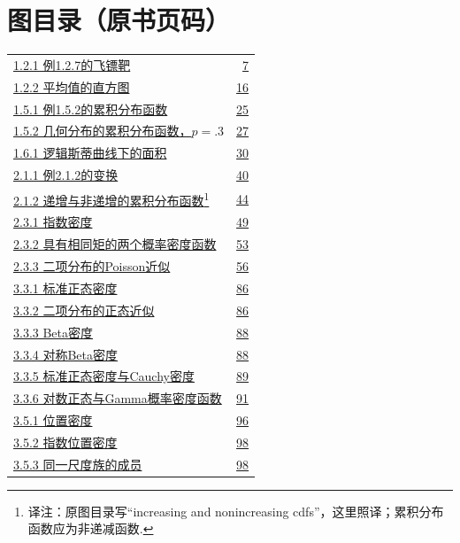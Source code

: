 \section*{图目录（原书页码）}\label{front:figures}
\begingroup\small
\begin{longtable}{@{}p{}r@{}}
\hyperref[fig:1.2.1]{1.2.1 例1.2.7的飞镖靶} & \hyperref[fig:1.2.1]{7} \\
\hyperref[fig:1.2.2]{1.2.2 平均值的直方图} & \hyperref[fig:1.2.2]{16} \\
\hyperref[fig:1.5.1]{1.5.1 例1.5.2的累积分布函数} & \hyperref[fig:1.5.1]{25} \\
\hyperref[fig:1.5.2]{1.5.2 几何分布的累积分布函数，$p=.3$} & \hyperref[fig:1.5.2]{27} \\
\hyperref[fig:1.6.1]{1.6.1 逻辑斯蒂曲线下的面积} & \hyperref[fig:1.6.1]{30} \\
\hyperref[fig:2.1.1]{2.1.1 例2.1.2的变换} & \hyperref[fig:2.1.1]{40} \\
\hyperref[fig:2.1.2]{2.1.2 递增与非递增的累积分布函数}\footnote{译注：原图目录写“increasing and nonincreasing cdfs”，这里照译；累积分布函数应为非递减函数.} & \hyperref[fig:2.1.2]{44} \\
\hyperref[fig:2.3.1]{2.3.1 指数密度} & \hyperref[fig:2.3.1]{49} \\
\hyperref[fig:2.3.2]{2.3.2 具有相同矩的两个概率密度函数} & \hyperref[fig:2.3.2]{53} \\
\hyperref[fig:2.3.3]{2.3.3 二项分布的Poisson近似} & \hyperref[fig:2.3.3]{56} \\
\hyperref[fig:3.3.1]{3.3.1 标准正态密度} & \hyperref[fig:3.3.1]{86} \\
\hyperref[fig:3.3.2]{3.3.2 二项分布的正态近似} & \hyperref[fig:3.3.2]{86} \\
\hyperref[fig:3.3.3]{3.3.3 Beta密度} & \hyperref[fig:3.3.3]{88} \\
\hyperref[fig:3.3.4]{3.3.4 对称Beta密度} & \hyperref[fig:3.3.4]{88} \\
\hyperref[fig:3.3.5]{3.3.5 标准正态密度与Cauchy密度} & \hyperref[fig:3.3.5]{89} \\
\hyperref[fig:3.3.6]{3.3.6 对数正态与Gamma概率密度函数} & \hyperref[fig:3.3.6]{91} \\
\hyperref[fig:3.5.1]{3.5.1 位置密度} & \hyperref[fig:3.5.1]{96} \\
\hyperref[fig:3.5.2]{3.5.2 指数位置密度} & \hyperref[fig:3.5.2]{98} \\
\hyperref[fig:3.5.3]{3.5.3 同一尺度族的成员} & \hyperref[fig:3.5.3]{98} \\

\end{longtable}
